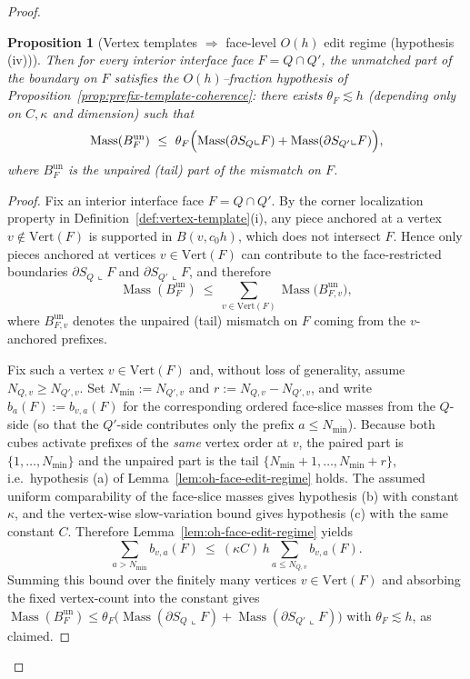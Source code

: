 \documentclass[11pt]{article}
\numberwithin{equation}{section}  %
\theoremstyle{plain}
\newtheorem{proposition}[theorem]{Proposition}
\theoremstyle{definition}
\theoremstyle{remark}
\DeclareMathOperator{\Mass}{Mass}
\begin{document}
\begin{proof}
\begin{proposition}[Vertex templates $\Rightarrow$ face-level $O(h)$ edit regime (hypothesis \textnormal{(iv)})]
Then for every interior interface face $F=Q\cap Q'$, the unmatched part of the boundary on $F$ satisfies the $O(h)$--fraction hypothesis
of Proposition~\ref{prop:prefix-template-coherence}:
there exists $\theta_F\lesssim h$ (depending only on $C,\kappa$ and dimension) such that
\[
\Mass(B_F^{\mathrm{un}})\ \le\ \theta_F\Bigl(\Mass(\partial S_Q\llcorner F)+\Mass(\partial S_{Q'}\llcorner F)\Bigr),
\]
where $B_F^{\mathrm{un}}$ is the unpaired (tail) part of the mismatch on $F$.

\end{proposition}


\begin{proof}

Fix an interior interface face $F=Q\cap Q'$.
By the corner localization property in Definition~\ref{def:vertex-template}\textnormal{(i)}, any piece anchored at a vertex
$v\notin\mathrm{Vert}(F)$ is supported in $B(v,c_0h)$, which does not intersect $F$.
Hence only pieces anchored at vertices $v\in\mathrm{Vert}(F)$ can contribute to the face-restricted boundaries
$\partial S_Q\llcorner F$ and $\partial S_{Q'}\llcorner F$, and therefore
\[
\Mass(B_F^{\mathrm{un}})\ \le\ \sum_{v\in\mathrm{Vert}(F)} \Mass\bigl(B_{F,v}^{\mathrm{un}}\bigr),
\]
where $B_{F,v}^{\mathrm{un}}$ denotes the unpaired (tail) mismatch on $F$ coming from the $v$-anchored prefixes.

Fix such a vertex $v\in\mathrm{Vert}(F)$ and, without loss of generality, assume $N_{Q,v}\ge N_{Q',v}$.
Set $N_{\min}:=N_{Q',v}$ and $r:=N_{Q,v}-N_{Q',v}$, and write $b_a(F):=b_{v,a}(F)$ for the corresponding ordered face-slice masses
from the $Q$-side (so that the $Q'$-side contributes only the prefix $a\le N_{\min}$).
Because both cubes activate prefixes of the \emph{same} vertex order at $v$, the paired part is $\{1,\dots,N_{\min}\}$ and the unpaired
part is the tail $\{N_{\min}+1,\dots,N_{\min}+r\}$, i.e.\ hypothesis \textnormal{(a)} of Lemma~\ref{lem:oh-face-edit-regime} holds.
The assumed uniform comparability of the face-slice masses gives hypothesis \textnormal{(b)} with constant $\kappa$, and the vertex-wise
slow-variation bound gives hypothesis \textnormal{(c)} with the same constant $C$.
Therefore Lemma~\ref{lem:oh-face-edit-regime} yields
\[
\sum_{a>N_{\min}} b_{v,a}(F)\ \le\ (\kappa C)\,h\sum_{a\le N_{Q,v}} b_{v,a}(F).
\]
Summing this bound over the finitely many vertices $v\in\mathrm{Vert}(F)$ and absorbing the fixed vertex-count into the constant
gives $\Mass(B_F^{\mathrm{un}})\le \theta_F\bigl(\Mass(\partial S_Q\llcorner F)+\Mass(\partial S_{Q'}\llcorner F)\bigr)$ with
$\theta_F\lesssim h$, as claimed.


\end{proof}
\end{proof}
\end{document}
